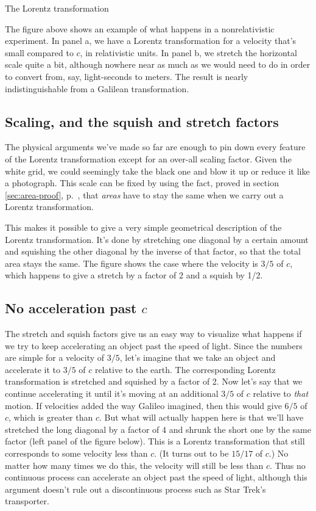 \begin{section}{The Lorentz transformation}



The figure above shows an example of what happens in a nonrelativistic experiment. In panel a,
we have a Lorentz transformation for a velocity that's small compared to $c$, in relativistic units.
In panel b, we stretch the horizontal scale quite a bit, although nowhere near as much as we would
need to do in order to convert from, say, light-seconds to meters. The result is nearly indistinguishable
from a Galilean transformation.

\section[Scale, squish, stretch]{Scaling, and the squish and stretch factors}\label{sec:stretch}

The physical arguments we've made so far are enough to pin down every feature of the Lorentz transformation
except for an over-all scaling factor. Given the white grid, we could seemingly take the black
one and blow it up or reduce it
like a photograph. This scale can be fixed by using the fact, proved in section \ref{sec:area-proof},
p.~\pageref{sec:area-proof}, that \emph{areas} have to stay the same when we carry out a Lorentz transformation.


This makes it possible to give a very simple geometrical description of the Lorentz transformation.
It's done by stretching one diagonal by a certain amount and squishing the other diagonal by the inverse
of that factor, so that the total area stays the same. The figure shows the case where the velocity is $3/5$ of
$c$, which happens to give a stretch by a factor of 2 and a squish by 1/2.

\section{No acceleration past $c$}\label{sec:no-accel-past-c}

The stretch and squish factors give us an easy way to visualize what happens if we try to keep accelerating
an object past the speed of light. Since the numbers are simple for a velocity of $3/5$, let's imagine that
we take an object and accelerate it to $3/5$ of $c$ relative to the earth. The corresponding Lorentz transformation
is stretched and squished by a factor of 2. Now let's say that we continue accelerating it until it's moving at
an additional $3/5$ of $c$ relative to \emph{that} motion. If velocities added the way Galileo imagined, then this would
give $6/5$ of $c$, which is greater than $c$. But what will actually happen here is that we'll have stretched the
long diagonal by a factor of 4 and shrunk the short one by the same factor (left panel of the figure below).
This is a Lorentz transformation that
still corresponds to some velocity less than $c$. (It turns out to be $15/17$ of $c$.)
No matter how many times we do this, the velocity will still be
less than $c$. Thus no continuous process can accelerate an object past the speed of light, although this
argument doesn't rule out a discontinuous process such as Star Trek's transporter.


\end{section}
